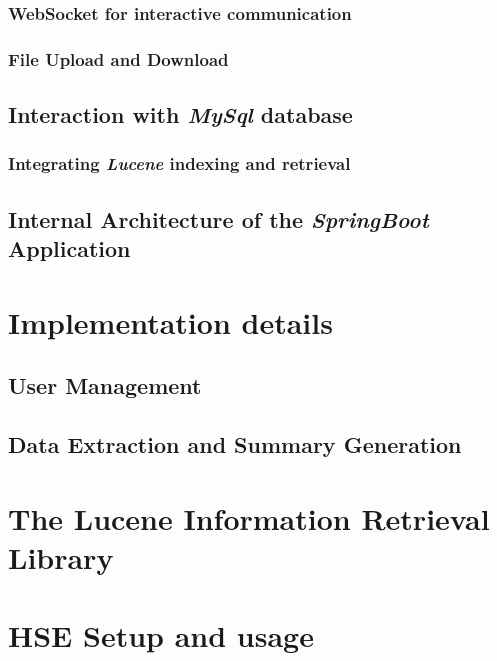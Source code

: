 \documentclass[a4paper]{usiinfbachelorproject}
\begin{document}
\subsubsection{WebSocket for interactive communication}


\subsubsection{File Upload and Download}


\subsection{Interaction with \emph{MySql} database}


\subsubsection{Integrating \emph{Lucene} indexing and retrieval}



\subsection{\textbf{Internal Architecture of the \emph{SpringBoot} Application}} \label{sec:archBackend}






\section{\textbf{Implementation details}} \label{sec:impl}

\subsection{\textbf{User Management}} \label{impl:users}

\subsection{\textbf{Data Extraction and Summary Generation}} \label{impl:dataSummaries}


\newpage

\begin{appendices}

\section{The Lucene Information Retrieval Library}

\section{HSE Setup and usage}


\end{appendices}


\newpage
	


\end{document}
